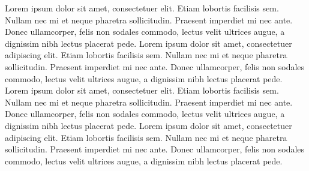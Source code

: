 Lorem ipsum dolor sit amet, consectetuer elit. Etiam lobortis 
facilisis sem. Nullam nec mi et neque pharetra sollicitudin. Praesent 
imperdiet mi nec ante. Donec ullamcorper, felis non sodales commodo, 
lectus velit ultrices augue, a dignissim nibh lectus placerat pede.
Lorem ipsum dolor sit amet, consectetuer adipiscing elit. Etiam lobortis 
facilisis sem. Nullam nec mi et neque pharetra sollicitudin. Praesent 
imperdiet mi nec ante. Donec ullamcorper, felis non sodales commodo, 
lectus velit ultrices augue, a dignissim nibh lectus placerat pede.
Lorem ipsum dolor sit amet, consectetuer elit. Etiam lobortis 
facilisis sem. Nullam nec mi et neque pharetra sollicitudin. Praesent 
imperdiet mi nec ante. Donec ullamcorper, felis non sodales commodo, 
lectus velit ultrices augue, a dignissim nibh lectus placerat pede.
Lorem ipsum dolor sit amet, consectetuer adipiscing elit. Etiam lobortis 
facilisis sem. Nullam nec mi et neque pharetra sollicitudin. Praesent 
imperdiet mi nec ante. Donec ullamcorper, felis non sodales commodo, 
lectus velit ultrices augue, a dignissim nibh lectus placerat pede.


